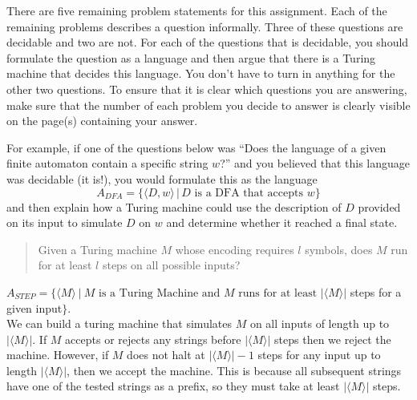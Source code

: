 
There are five remaining problem statements for this assignment. Each of the remaining problems describes
a question informally. Three of these questions are decidable and two are not. For each of the questions
that is decidable, you should formulate the question as a language and then argue that there is a Turing
machine that decides this language. You don't have to turn in anything for the other two questions.
To ensure that it is clear which questions you are answering, make sure that the number of each problem
you decide to answer is clearly visible on the page(s) containing your answer. 

For example, if one of the questions below was ``Does the language of a given 
finite automaton contain a specific string $w$?'' and you believed that this language
was decidable (it is!), you would formulate this as the language
\[
A_{DFA} = \{ \langle D, w \rangle \,|\, \mbox{$D$ is a DFA that accepts $w$}\}
\]
and then explain how a Turing machine could use the description of $D$ provided on its input
to simulate $D$ on $w$ and determine whether it reached a final state.

\item
\begin{quote}
Given a Turing machine $M$ whose encoding requires $l$ symbols, does $M$ run for at least $l$
steps on all possible inputs?
\end{quote}

\begin{solution}

$A_{STEP} = \{\langle M \rangle ~|~ M \mbox{ is a Turing Machine and } M \mbox{ runs for at least } |\langle M \rangle|$ steps for a given input$\}$.\\
We can build a turing machine that simulates $M$ on all inputs of length up to $|\langle M \rangle|$. If $M$ accepts or rejects any strings before $|\langle M \rangle|$ steps then we reject the machine. However, if $M$ does not halt at $|\langle M \rangle|-1$ steps for any input up to length $|\langle M \rangle|$, then we accept the machine. This is because all subsequent strings have one of the tested strings as a prefix, so they must take at least $|\langle M \rangle|$ steps.

\end{solution}
